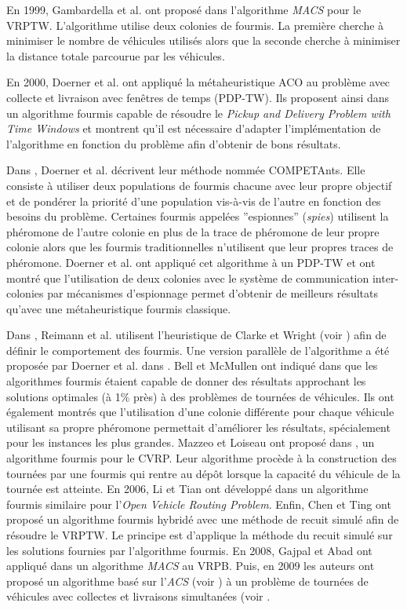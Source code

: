 En 1999, Gambardella et al. ont proposé dans \cite{Gambardella1999} l'algorithme \textit{MACS} pour le VRPTW. L'algorithme utilise deux colonies de fourmis. La première cherche à minimiser le nombre de véhicules utilisés alors que la seconde cherche à minimiser la distance totale parcourue par les véhicules.

En 2000, Doerner et al. ont appliqué la métaheuristique ACO au problème avec collecte et livraison avec fenêtres de temps (PDP-TW). Ils proposent ainsi dans \cite{Doerner2000} un algorithme fourmis capable de résoudre le \textit{Pickup and Delivery Problem with Time Windows} et montrent qu'il est nécessaire d'adapter l'implémentation de l'algorithme en fonction du problème afin d'obtenir de bons résultats.

Dans \cite{Doerner2001}, Doerner et al. décrivent leur méthode nommée COMPETAnts. Elle consiste à utiliser deux populations de fourmis chacune avec leur propre objectif et de pondérer la priorité d'une population vis-à-vis de l'autre en fonction des besoins du problème. Certaines fourmis appelées ''espionnes'' (\textit{spies}) utilisent la phéromone de l'autre colonie en plus de la trace de phéromone de leur propre colonie alors que les fourmis traditionnelles n'utilisent que leur propres traces de phéromone. Doerner et al. ont appliqué cet algorithme à un PDP-TW et ont montré que l'utilisation de deux colonies avec le système de communication inter-colonies par mécanismes d'espionnage permet d'obtenir de meilleurs résultats qu'avec une métaheuristique fourmis classique.

Dans \cite{Reimann2004}, Reimann et al. utilisent l'heuristique de Clarke et Wright (voir \cite{Clarke1964}) afin de définir le comportement des fourmis. Une version parallèle de l'algorithme a été proposée par Doerner et al. dans \cite{Doerner2005}. Bell et McMullen ont indiqué dans \cite{Bell2004} que les algorithmes fourmis étaient capable de donner des résultats approchant les solutions optimales (à 1\% près) à des problèmes de tournées de véhicules. Ils ont également montrés que l'utilisation d'une colonie différente pour chaque véhicule utilisant sa propre phéromone permettait d'améliorer les résultats, spécialement pour les instances les plus grandes. Mazzeo et Loiseau ont proposé dans \cite{Mazzeo2004}, un algorithme fourmis pour le CVRP. Leur algorithme procède à la construction des tournées par une fourmis qui rentre au dépôt lorsque la capacité du véhicule de la tournée est atteinte. En 2006, Li et Tian ont développé dans \cite{Li2006} un algorithme fourmis similaire pour l'\textit{Open Vehicle 
Routing Problem}.  Enfin, Chen et Ting \cite{Chen2005} ont proposé un algorithme fourmis hybridé avec une méthode de recuit simulé afin de résoudre le VRPTW. Le principe est d'applique la méthode du recuit simulé sur les solutions fournies par l'algorithme fourmis.
En 2008, Gajpal et Abad ont appliqué dans \cite{Gajpal2008} un algorithme \textit{MACS} au VRPB. Puis, en 2009 les auteurs ont proposé un algorithme basé sur l'\textit{ACS} (voir \cite{Dorigo1997}) à un problème de tournées de véhicules avec collectes et livraisons simultanées (voir \cite{Gajpal2009}.\\

